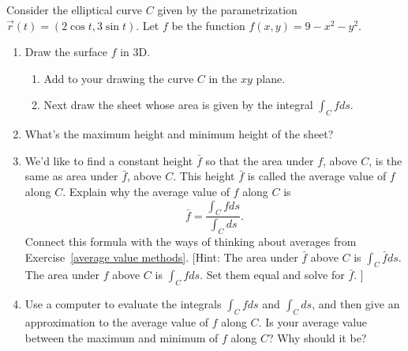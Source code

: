 \begin{problem}\label{Average Value intro}%
%
 Consider the elliptical curve $C$ given by the parametrization $\vec r(t) = (2\cos t, 3\sin t)$.  Let $f$ be the function $f(x,y)=9-x^2-y^2$.    
\begin{enumerate}
	\item Draw the surface $f$ in 3D.
		\begin{enumerate}
			\item Add to your drawing the curve $C$ in the $xy$ plane. 
			\item Next draw the sheet whose area is given by the integral $\int_C f ds$.
		\end{enumerate}
  \item What's the maximum height and minimum height of the sheet? 
  \item We'd like to find a constant height $\bar f$ so that the area under $f$, above $C$, is the same as area under $\bar f$, above $C$. This height $\bar f$ is called the average value of $f$ along $C$. 
{}%
Explain why the average value of $f$ along $C$ is 
$$\bar f = \frac{\int_C f ds}{\int_C ds}.$$
Connect this formula with the ways of thinking about averages from Exercise~\ref{average value methods}.
[Hint: The area under $\bar f$ above $C$ is $\int_C \bar f ds$. The area under $f$ above $C$ is $\int_C f ds$. Set them equal and solve for $\bar f$. ]  
  \item 
{}%
Use a computer to evaluate the integrals $\int_C f ds$ and $\int_C ds$, and then give an approximation to the average value of $f$ along $C$. Is your average value between the maximum and minimum of $f$ along $C$? Why should it be?
 \end{enumerate}
\end{problem}


